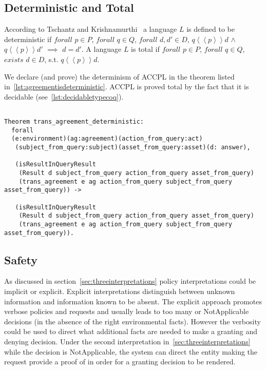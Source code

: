 \subsection{Deterministic and Total}

According to Tschantz and Krishnamurthi~\cite{Tschantz} a language $L$ is defined to be deterministic if $forall$ $p \in P$, $forall$ $q \in Q$, $forall$ $d, d' \in D$, $q \left\langle\left\langle p  \right\rangle\right\rangle d$ $\land$ $q \left\langle\left\langle p  \right\rangle\right\rangle d'$ $\implies$ $d = d'$. A language $L$ is total if $forall$ $p \in P$, $forall$ $q \in Q$, $exists$ $d \in D$, s.t. $q \left\langle\left\langle p  \right\rangle\right\rangle d$. 

We declare (and prove) the determinism of \ac{ACCPL} in the theorem listed in~\ref{lst:agreementisdeterministic}. \ac{ACCPL} is proved total by the fact that it is decidable (see~\ref{lst:decidabletypecoq}). 

\begin{lstlisting}

Theorem trans_agreement_deterministic:
  forall
  (e:environment)(ag:agreement)(action_from_query:act)
   (subject_from_query:subject)(asset_from_query:asset)(d: answer),

   (isResultInQueryResult 
    (Result d subject_from_query action_from_query asset_from_query)
    (trans_agreement e ag action_from_query subject_from_query asset_from_query)) ->

   (isResultInQueryResult 
    (Result d subject_from_query action_from_query asset_from_query)
    (trans_agreement e ag action_from_query subject_from_query asset_from_query)).
\end{lstlisting}


\subsection{Safety}

As discussed in section~\ref{sec:threeinterpretations} policy interpretations could be implicit or explicit. Explicit interpretations distinguish between unknown information and information known to be absent. The explicit approach promotes verbose policies and requests and usually leads to too many  or NotApplicable decisions (in the absence of the right environmental facts). However the verbosity could be used to direct what additional facts are needed to make a granting and denying decision. Under the second interpretation in~\ref{sec:threeinterpretations} while the decision is NotApplicable, the system can direct the entity making the request provide a proof of  in order for a granting decision to be rendered. 

